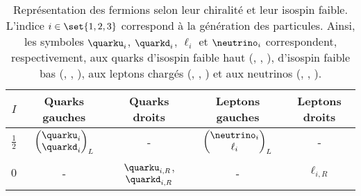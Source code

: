 \begin{table}[h]
\centering
\begin{tabular}{ccccc}
\toprule
$I$ & Quarks gauches & Quarks droits & Leptons gauches & Leptons droits\\
\midrule
$\frac{1}{2}$ & $\displaystyle \begin{pmatrix} \quarku_i \\ \quarkd_i \end{pmatrix}_L$ & - & $\displaystyle \begin{pmatrix} \neutrino_i \\ \ell_i \end{pmatrix}_L$ & - \\
$0$ & - & $\quarku_{i,R}$, $\quarkd_{i,R}$ & - & $\ell_{i,R}$\\
\bottomrule
\end{tabular}
\caption[Représentation des fermions selon leur chiralité et leur isospin faible.]{Représentation des fermions selon leur chiralité et leur isospin faible. L'indice $i\in\set{1,2,3}$ correspond à la génération des particules. Ainsi, les symboles $\quarku_i$, $\quarkd_i$, $\ell_i$ et $\neutrino_i$ correspondent, respectivement, aux quarks d'isospin faible haut (\quarku, \quarkc, \quarkt), d'isospin faible bas (\quarkd, \quarks, \quarkb), aux leptons chargés (\ele, \mu, \tau) et aux neutrinos (\nuele, \numu, \nutau).}
\label{tab-chapter-MS-MSSM-section-formalisme-subsec-EW-rzpt_fermions_chiralite_isospin}
\end{table}
